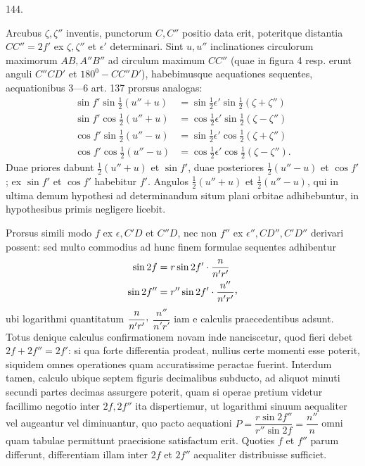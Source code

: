 \par{}\medskip
{}\begin{center}\hypertarget{native-195-article144}{}144.\end{center}
Arcubus $\zeta,\zeta''$ inventis, punctorum $C,C''$ positio data erit, poteritque distantia
$CC''=2f'$ ex $\zeta,\zeta''$ et $\epsilon'$ determinari. Sint $u,u''$ inclinationes circulorum
maximorum $AB,A''B''$ ad circulum maximum $CC''$ (quae in figura 4 resp.
erunt anguli $C''CD'$ et $180^{0}-CC''D'$), habebimusque aequationes sequentes,
aequationibus 3—6 art. 137 prorsus analogas:
\[
\begin{aligned}
\sin f'\sin\tfrac12(u''+u)&=\sin\tfrac12\epsilon'\sin\tfrac12(\zeta+\zeta'')\\
\sin f'\cos\tfrac12(u''+u)&=\cos\tfrac12\epsilon'\sin\tfrac12(\zeta-\zeta'')\\
\cos f'\sin\tfrac12(u''-u)&=\sin\tfrac12\epsilon'\cos\tfrac12(\zeta+\zeta'')\\
\cos f'\cos\tfrac12(u''-u)&=\cos\tfrac12\epsilon'\cos\tfrac12(\zeta-\zeta'').
\end{aligned}
\]
Duae priores dabunt $\tfrac12(u''+u)$ et $\sin f'$, duae posteriores $\tfrac12(u''-u)$ et $\cos f'$; ex
$\sin f'$ et $\cos f'$ habebitur $f'$. Angulos $\tfrac12(u''+u)$ et $\tfrac12(u''-u)$, qui in ultima demum
hypothesi ad determinandum situm plani orbitae adhibebuntur, in hypothesibus
primis negligere licebit.

Prorsus simili modo $f$ ex $\epsilon,C'D$ et $C''D$, nec non $f''$ ex $\epsilon'',CD'',C'D''$
derivari possent: sed multo commodius ad hunc finem formulae sequentes adhibentur
\[
\begin{aligned}
\sin2f&=r\sin2f'\cdot\frac{n}{n'r'}\\
\sin2f''&=r''\sin2f'\cdot\frac{n''}{n'r'}\mathpunct{\raisebox{.45ex}{,}}
\end{aligned}
\]
ubi logarithmi quantitatum $\dfrac{n}{n'r'}\mathpunct{\raisebox{.45ex}{,}}$ $\dfrac{n''}{n'r'}$ iam e calculis praecedentibus adsunt.
Totus denique calculus confirmationem novam inde nanciscetur, quod fieri
debet $2f+2f''=2f'$: si qua forte differentia prodeat, nullius certe momenti
esse poterit, siquidem omnes operationes quam accuratissime peractae fuerint.
Interdum tamen, calculo ubique septem figuris decimalibus subducto, ad aliquot
minuti secundi partes decimas assurgere poterit, quam si operae pretium
videtur facillimo negotio inter $2f,2f''$ ita dispertiemur, ut logarithmi sinuum
aequaliter vel augeantur vel diminuantur, quo pacto aequationi $P=\dfrac{r\sin2f''}{r''\sin2f}=\dfrac{n''}{n}$
omni quam tabulae permittunt praecisione satisfactum erit. Quoties $f$ et
$f''$ parum differunt, differentiam illam inter $2f$ et $2f''$ aequaliter distribuisse
sufficiet.
